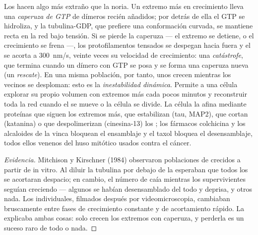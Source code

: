 \begin{definition}\label{def:b3:cytoskeleton-motility:instability}
Los  hacen algo más extraño que la noria. Un extremo más en
crecimiento lleva una \emph{caperuza de GTP} de dímeros recién añadidos;
por detrás de ella el GTP se hidroliza, y la tubulina-GDP, que prefiere
una conformación curvada, se mantiene recta en la red bajo tensión. Si se
pierde la caperuza --- el extremo se detiene, o el crecimiento se frena
---, los protofilamentos tensados se despegan hacia fuera y el
 se acorta a \qty{300}{nm/s}, veinte veces su velocidad de
crecimiento: una \emph{catástrofe}, que termina cuando un dímero con GTP
se posa y se forma una caperuza nueva (un \emph{rescate}). En una misma
población, por tanto, unos  crecen mientras los vecinos se
desploman: esto es la \emph{inestabilidad dinámica}. Permite a una célula
explorar su propio volumen con extremos más cada pocos minutos y
reconstruir toda la red cuando el  se mueve o la célula se
divide. La célula la afina mediante proteínas que siguen los extremos
más, que estabilizan (tau, MAP2), que cortan (katanina) o que
despolimerizan (cinesina-13) los ; los fármacos colchicina y
los alcaloides de la vinca bloquean el ensamblaje y el taxol bloquea el
desensamblaje, todos ellos venenos del huso mitótico usados contra el
cáncer.
\end{definition}

\begin{proof}[Evidencia]
Mitchison y Kirschner (1984) observaron poblaciones de 
crecidos a partir de  in vitro. Al diluir la tubulina por
debajo de la  esperaban que todos los 
se acortaran despacio; en cambio, el número de  caía mientras
los supervivientes seguían creciendo --- algunos se habían desensamblado
del todo y deprisa, y otros nada. Los  individuales,
filmados después por videomicroscopia, cambiaban bruscamente entre fases
de crecimiento constante y de acortamiento rápido. La 
explicaba ambas cosas: solo crecen los extremos con caperuza, y perderla
es un suceso raro de todo o nada.
\end{proof}

